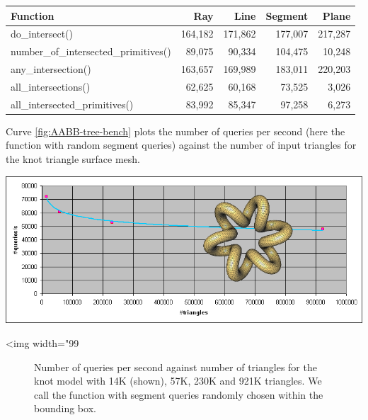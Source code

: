 \begin{tabular}{|l|r|r|r|r|}
  \hline
  Function                              &     Ray &    Line & Segment &   Plane \\
  \hline
  do\_intersect()                       & 164,182 & 171,862 & 177,007 & 217,287 \\
  number\_of\_intersected\_primitives() &  89,075 &  90,334 & 104,475 &  10,248 \\
  any\_intersection()                   & 163,657 & 169,989 & 183,011 & 220,203 \\
  all\_intersections()                  &  62,625 &  60,168 &  73,525 &   3,026 \\
  all\_intersected\_primitives()        &  83,992 &  85,347 &  97,258 &   6,273 \\
  \hline
\end{tabular}

Curve \ref{fig:AABB-tree-bench} plots the number of queries per second (here the  function with random segment queries) against the number of input triangles for the knot triangle surface mesh.

\begin{center}
    \label{fig:AABB-tree-bench}
    \begin{ccTexOnly}
      \includegraphics[width=1.0\textwidth]{AABB_tree/bench}
    \end{ccTexOnly}
    \begin{ccHtmlOnly}
        <img width="99%
    \end{ccHtmlOnly}
    \begin{figure}[h]
        \caption{Number of queries per second against number of triangles
                 for the knot model with 14K (shown), 57K, 230K and 921K
                 triangles. We call the  function
                 with segment queries randomly chosen within
                 the bounding box. }
    \end{figure}
\end{center}

